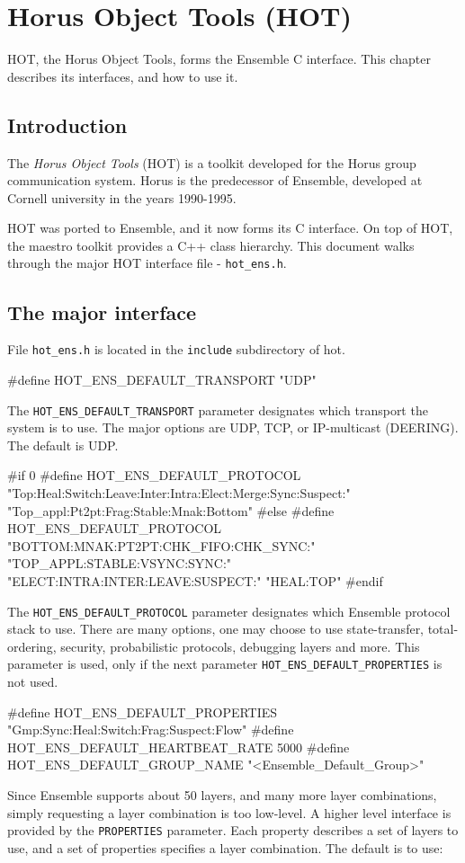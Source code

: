 \section{Horus Object Tools (HOT)}

HOT, the Horus Object Tools, forms the Ensemble C interface. This
chapter describes its interfaces, and how to use it. 

\subsection{Introduction}
The {\it Horus Object Tools} (HOT) is a toolkit developed for
the Horus group communication system. Horus is the predecessor of
Ensemble, developed at Cornell university in the years 1990-1995. 

HOT was ported to Ensemble, and it now forms its C interface. On top
of HOT, the maestro toolkit provides a C++ class hierarchy. This
document walks through the major HOT interface file - {\tt hot\_ens.h}.

\subsection{The major interface }
File {\tt hot\_ens.h} is located in the {\tt include} subdirectory 
of hot. 

\begin{codebox}
#define HOT_ENS_DEFAULT_TRANSPORT "UDP"
\end{codebox}
The {\tt HOT\_ENS\_DEFAULT\_TRANSPORT} parameter designates which
transport the system is to use. The major options are UDP, TCP,
or IP-multicast (DEERING). The default is UDP. 

\begin{codebox}
#if 0
#define HOT_ENS_DEFAULT_PROTOCOL 
      "Top:Heal:Switch:Leave:Inter:Intra:Elect:Merge:Sync:Suspect:" 
      "Top_appl:Pt2pt:Frag:Stable:Mnak:Bottom"
#else
#define HOT_ENS_DEFAULT_PROTOCOL 
   "BOTTOM:MNAK:PT2PT:CHK_FIFO:CHK_SYNC:" 
   "TOP_APPL:STABLE:VSYNC:SYNC:" 
   "ELECT:INTRA:INTER:LEAVE:SUSPECT:" 
   "HEAL:TOP"
#endif
\end{codebox}
The {\tt HOT\_ENS\_DEFAULT\_PROTOCOL} parameter designates which
Ensemble protocol stack to use. There are many options, one may choose
to use state-transfer, total-ordering, security, probabilistic
protocols, debugging layers and more. This parameter is used, only if
the next parameter {\tt HOT\_ENS\_DEFAULT\_PROPERTIES} is not used.

\begin{codebox}
#define HOT_ENS_DEFAULT_PROPERTIES "Gmp:Sync:Heal:Switch:Frag:Suspect:Flow"
#define HOT_ENS_DEFAULT_HEARTBEAT_RATE 5000
#define HOT_ENS_DEFAULT_GROUP_NAME "<Ensemble_Default_Group>"
\end{codebox}
Since Ensemble supports about 50 layers, and many more layer
combinations, simply requesting a layer combination is too
low-level. A higher level interface is provided by the {\tt PROPERTIES}
parameter. Each property describes a set of layers to use, and a set
of properties specifies a layer combination. The default is to use: \newline
\vspace{1mm}

